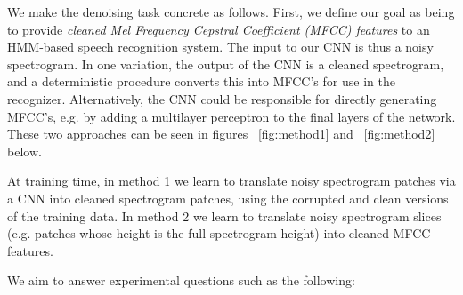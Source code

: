 \documentclass[11pt]{article}
\begin{document}
We make the denoising task concrete as follows. First, we define our goal as being to provide \textit{cleaned Mel Frequency Cepstral Coefficient (MFCC) features} to an HMM-based speech recognition system. The input to our CNN is thus a noisy spectrogram. In one variation, the output of the CNN is a cleaned spectrogram, and a deterministic procedure converts this into MFCC's for use in the recognizer. Alternatively, the CNN could be responsible for directly generating MFCC's, e.g. by adding a multilayer perceptron to the final layers of the network. These two approaches can be seen in figures ~\ref{fig:method1} and ~\ref{fig:method2} below.


At training time, in method 1 we learn to translate noisy spectrogram patches via a CNN into cleaned spectrogram patches, using the corrupted and clean versions of the training data. In method 2 we learn to translate noisy spectrogram slices (e.g. patches whose height is the full spectrogram height) into cleaned MFCC features.

We aim to answer experimental questions such as the following:
\end{document}
